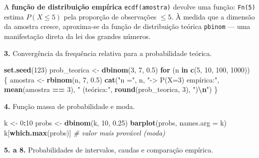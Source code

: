\documentclass[
  portuguese,
  11pt,
  openany]{book}
\newenvironment{Shaded}{\begin{snugshade}}{\end{snugshade}}
\newcommand{\AttributeTok}[1]{\textcolor[rgb]{0.13,0.29,0.53}{#1}}
\newcommand{\CommentTok}[1]{\textcolor[rgb]{0.56,0.35,0.01}{\textit{#1}}}
\newcommand{\ControlFlowTok}[1]{\textcolor[rgb]{0.13,0.29,0.53}{\textbf{#1}}}
\newcommand{\DecValTok}[1]{\textcolor[rgb]{0.00,0.00,0.81}{#1}}
\newcommand{\FloatTok}[1]{\textcolor[rgb]{0.00,0.00,0.81}{#1}}
\newcommand{\FunctionTok}[1]{\textcolor[rgb]{0.13,0.29,0.53}{\textbf{#1}}}
\newcommand{\NormalTok}[1]{#1}
\newcommand{\OtherTok}[1]{\textcolor[rgb]{0.56,0.35,0.01}{#1}}
\newcommand{\SpecialCharTok}[1]{\textcolor[rgb]{0.81,0.36,0.00}{\textbf{#1}}}
\newcommand{\StringTok}[1]{\textcolor[rgb]{0.31,0.60,0.02}{#1}}
\begin{document}
A \textbf{função de distribuição empírica} \texttt{ecdf(amostra)} devolve uma função: \texttt{Fn(5)}
estima \(P(X \le 5)\) pela proporção de observações \(\le 5\). À medida que a
dimensão da amostra cresce, aproxima-se da função de distribuição teórica
\texttt{pbinom} --- uma manifestação direta da lei dos grandes números.

\textbf{3.} Convergência da frequência relativa para a probabilidade teórica.

\begin{Shaded}
\begin{Highlighting}[]
\FunctionTok{set.seed}\NormalTok{(}\DecValTok{123}\NormalTok{)}
\NormalTok{prob\_teorica }\OtherTok{\textless{}{-}} \FunctionTok{dbinom}\NormalTok{(}\DecValTok{3}\NormalTok{, }\DecValTok{7}\NormalTok{, }\FloatTok{0.5}\NormalTok{)}
\ControlFlowTok{for}\NormalTok{ (n }\ControlFlowTok{in} \FunctionTok{c}\NormalTok{(}\DecValTok{5}\NormalTok{, }\DecValTok{10}\NormalTok{, }\DecValTok{100}\NormalTok{, }\DecValTok{1000}\NormalTok{)) \{}
\NormalTok{  amostra }\OtherTok{\textless{}{-}} \FunctionTok{rbinom}\NormalTok{(n, }\DecValTok{7}\NormalTok{, }\FloatTok{0.5}\NormalTok{)}
  \FunctionTok{cat}\NormalTok{(}\StringTok{"n ="}\NormalTok{, n, }\StringTok{"{-}\textgreater{} P(X=3) empírica:"}\NormalTok{, }\FunctionTok{mean}\NormalTok{(amostra }\SpecialCharTok{==} \DecValTok{3}\NormalTok{),}
      \StringTok{" (teórica:"}\NormalTok{, }\FunctionTok{round}\NormalTok{(prob\_teorica, }\DecValTok{3}\NormalTok{), }\StringTok{")}\SpecialCharTok{\textbackslash{}n}\StringTok{"}\NormalTok{)}
\NormalTok{\}}
\end{Highlighting}
\end{Shaded}

\textbf{4.} Função massa de probabilidade e moda.

\begin{Shaded}
\begin{Highlighting}[]
\NormalTok{k }\OtherTok{\textless{}{-}} \DecValTok{0}\SpecialCharTok{:}\DecValTok{10}
\NormalTok{probs }\OtherTok{\textless{}{-}} \FunctionTok{dbinom}\NormalTok{(k, }\DecValTok{10}\NormalTok{, }\FloatTok{0.25}\NormalTok{)}
\FunctionTok{barplot}\NormalTok{(probs, }\AttributeTok{names.arg =}\NormalTok{ k)}
\NormalTok{k[}\FunctionTok{which.max}\NormalTok{(probs)]        }\CommentTok{\# valor mais provável (moda)}
\end{Highlighting}
\end{Shaded}

\textbf{5. a 8.} Probabilidades de intervalos, caudas e comparação empírica.
\end{document}
